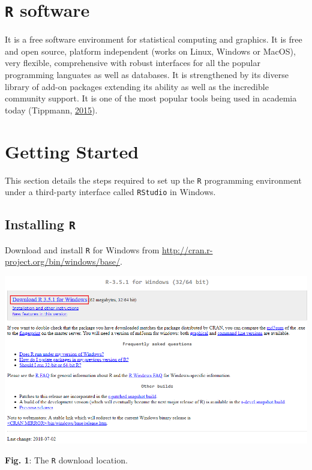 \hypertarget{rsoft}{%
\section{\texorpdfstring{\texttt{R} software}{R software}}\label{rsoft}}

It is a free software environment for statistical computing and
graphics. It is free and open source, platform independent (works on
Linux, Windows or MacOS), very flexible, comprehensive with robust
interfaces for all the popular programming languates as well as
databases. It is strengthened by its diverse library of add-on packages
extending its ability as well as the incredible community support. It is
one of the most popular tools being used in academia today (Tippmann,
\protect\hyperlink{ref-tippmann_programming_2015}{2015}).

\hypertarget{getting-started}{%
\section{Getting Started}\label{getting-started}}

This section details the steps required to set up the \texttt{R}
programming environment under a third-party interface called
\texttt{RStudio} in Windows.

\hypertarget{installing-r}{%
\subsection{\texorpdfstring{Installing
\texttt{R}}{Installing R}}\label{installing-r}}

Download and install \texttt{R} for Windows from
\url{http://cran.r-project.org/bin/windows/base/}.

\includegraphics{rbase.png}

\begin{center}
                \textbf{Fig. 1}: The \texttt{R} download location.
                \end{center}


